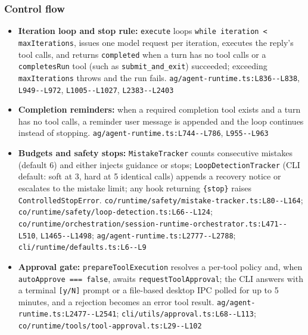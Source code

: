 \subsubsection*{Control flow}
\begin{itemize}
\item \textbf{Iteration loop and stop rule:} \texttt{execute} loops \texttt{while iteration < maxIterations}, issues one model request per iteration, executes the reply's tool calls, and returns \texttt{completed} when a turn has no tool calls or a \texttt{completesRun} tool (such as \texttt{submit\_\allowbreak{}and\_\allowbreak{}exit}) succeeded; exceeding \texttt{maxIterations} throws and the run fails. \texttt{ag/\allowbreak{}agent-\allowbreak{}runtime.\allowbreak{}ts:\allowbreak{}L836-\allowbreak{}-\allowbreak{}L838}, \texttt{L949-\allowbreak{}-\allowbreak{}L972}, \texttt{L1005-\allowbreak{}-\allowbreak{}L1027}, \texttt{L2383-\allowbreak{}-\allowbreak{}L2403}
\item \textbf{Completion reminders:} when a required completion tool exists and a turn has no tool calls, a reminder user message is appended and the loop continues instead of stopping. \texttt{ag/\allowbreak{}agent-\allowbreak{}runtime.\allowbreak{}ts:\allowbreak{}L744-\allowbreak{}-\allowbreak{}L786}, \texttt{L955-\allowbreak{}-\allowbreak{}L963}
\item \textbf{Budgets and safety stops:} \texttt{MistakeTracker} counts consecutive mistakes (default 6) and either injects guidance or stops; \texttt{LoopDetectionTracker} (CLI default: soft at 3, hard at 5 identical calls) appends a recovery notice or escalates to the mistake limit; any hook returning \texttt{\{stop\}} raises \texttt{ControlledStopError}. \texttt{co/\allowbreak{}runtime/\allowbreak{}safety/\allowbreak{}mistake-\allowbreak{}tracker.\allowbreak{}ts:\allowbreak{}L80-\allowbreak{}-\allowbreak{}L164}; \texttt{co/\allowbreak{}runtime/\allowbreak{}safety/\allowbreak{}loop-\allowbreak{}detection.\allowbreak{}ts:\allowbreak{}L66-\allowbreak{}-\allowbreak{}L124}; \texttt{co/\allowbreak{}runtime/\allowbreak{}orchestration/\allowbreak{}session-\allowbreak{}runtime-\allowbreak{}orchestrator.\allowbreak{}ts:\allowbreak{}L471-\allowbreak{}-\allowbreak{}L510}, \texttt{L1465-\allowbreak{}-\allowbreak{}L1498}; \texttt{ag/\allowbreak{}agent-\allowbreak{}runtime.\allowbreak{}ts:\allowbreak{}L2777-\allowbreak{}-\allowbreak{}L2788}; \texttt{cli/\allowbreak{}runtime/\allowbreak{}defaults.\allowbreak{}ts:\allowbreak{}L6-\allowbreak{}-\allowbreak{}L9}
\item \textbf{Approval gate:} \texttt{prepareToolExecution} resolves a per-tool policy and, when \texttt{autoApprove === false}, awaits \texttt{requestToolApproval}; the CLI answers with a terminal \texttt{[y/\allowbreak{}N]} prompt or a file-based desktop IPC polled for up to 5 minutes, and a rejection becomes an error tool result. \texttt{ag/\allowbreak{}agent-\allowbreak{}runtime.\allowbreak{}ts:\allowbreak{}L2477-\allowbreak{}-\allowbreak{}L2541}; \texttt{cli/\allowbreak{}utils/\allowbreak{}approval.\allowbreak{}ts:\allowbreak{}L68-\allowbreak{}-\allowbreak{}L113}; \texttt{co/\allowbreak{}runtime/\allowbreak{}tools/\allowbreak{}tool-\allowbreak{}approval.\allowbreak{}ts:\allowbreak{}L29-\allowbreak{}-\allowbreak{}L102}

\end{itemize}
